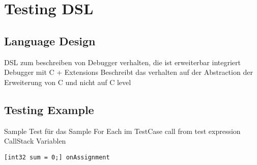 \section{Testing DSL}

\subsection{Language Design}
DSL zum beschreiben von Debugger verhalten, die ist erweiterbar integriert Debugger mit C + Extensions
	Beschreibt das verhalten auf der Abstraction der Erweiterung von C und nicht auf C level 
	
\subsection{Testing Example}
Sample
	Test für das Sample
		For Each im TestCase call from test expression
			CallStack
			Variablen
			
\begin{lstlisting}[language=reducedMbeddr]
	[int32 sum = 0;] onAssignment
\end{lstlisting}			
